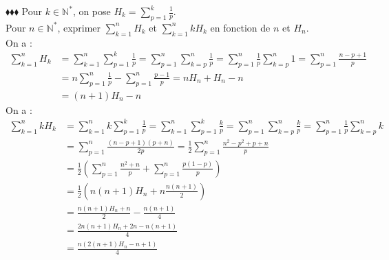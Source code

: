 \documentclass[11pt]{article}
\begin{document}
\begin{exercice}{$\blacklozenge\blacklozenge\blacklozenge$}{}
    Pour $k\in\mathbb{N}^*$, on pose $H_k=\sum\limits^k_{p=1}{\frac{1}{p}}$.\\
    Pour $n\in\mathbb{N}^*$, exprimer $\sum\limits^n_{k=1}H_k$ et $\sum\limits^n_{k=1}kH_k$ en fonction de $n$ et $H_n$.\\
    On a :
    \begin{align*}
        \sum^n_{k=1}{H_k}
        &=\sum^n_{k=1}{\sum^k_{p=1}{\frac{1}{p}}}
        =\sum^n_{p=1}{\sum^n_{k=p}{\frac{1}{p}}}
        =\sum^n_{p=1}{\frac{1}{p}\sum^n_{k=p}{1}}
        =\sum^n_{p=1}{\frac{n-p+1}{p}}\\
        &=n\sum^n_{p=1}{\frac{1}{p}}-\sum^n_{p=1}{\frac{p-1}{p}}
        =nH_n + H_n - n\\
        &=(n+1)H_n - n
    \end{align*}
    On a :
    \begin{align*}
        \sum^n_{k=1}{kH_k} &=\sum^n_{k=1}{k\sum^k_{p=1}{\frac{1}{p}}} =\sum^n_{k=1}{\sum^k_{p=1}{\frac{k}{p}}} = \sum^n_{p=1}{\sum^n_{k=p}{\frac{k}{p}}}=\sum^n_{p=1}{\frac{1}{p}\sum^n_{k=p}{k}}\\&
        =\sum^n_{p=1}{\frac{(n-p+1)(p+n)}{2p}} = \frac{1}{2}\sum^n_{p=1}{\frac{n^2-p^2+p+n}{p}}\\
        &=\frac{1}{2}\left(\sum^n_{p=1}{\frac{n^2+n}{p}}+\sum^{n}_{p=1}{\frac{p(1-p)}{p}}\right)\\
        &=\frac{1}{2}\left(n(n+1)H_n+n\frac{n(n+1)}{2}\right)\\
        &=\frac{n(n+1)H_n+n}{2}-\frac{n(n+1)}{4}\\
        &=\frac{2n(n+1)H_n+2n-n(n+1)}{4}\\
        &=\frac{n(2(n+1)H_n-n+1)}{4}
    \end{align*}
\end{exercice}
\end{document}
